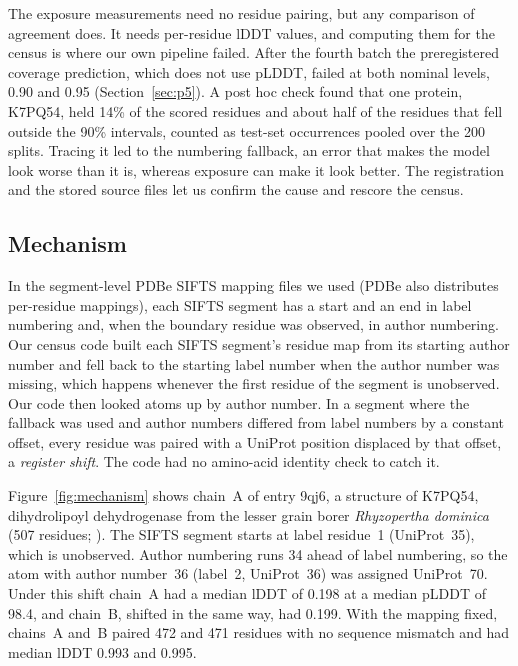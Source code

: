 \documentclass{article}
\begin{document}
The exposure measurements need no residue pairing, but any comparison of
agreement does. It needs per-residue lDDT values, and computing them for the
census is where our own pipeline failed. After the fourth batch the
preregistered coverage prediction, which does not use pLDDT, failed at both
nominal levels, 0.90 and 0.95 (Section~\ref{sec:p5}). A post hoc check
found that one protein, K7PQ54, held 14\% of the scored residues and about
half of the residues that fell outside the 90\% intervals, counted as test-set occurrences pooled over the 200 splits. Tracing it led to the numbering fallback, an error that makes the model look worse than it is, whereas exposure can make it look better. The registration and the stored
source files let us confirm the cause and rescore the census.

\subsection{Mechanism}
\label{sec:mechanism}

In the segment-level PDBe SIFTS mapping files we used (PDBe also distributes
per-residue mappings), each SIFTS segment has a start and
an end in label numbering and, when the boundary residue was observed, in
author numbering. Our census code built each SIFTS segment's residue map
from its starting author number and fell back to the starting label number
when the author number was missing, which happens whenever the first residue
of the segment is unobserved. Our code then looked atoms up by author
number. In a segment where the fallback was used and author numbers
differed from label numbers by a constant offset, every residue was paired
with a UniProt position displaced by that offset, a \emph{register shift}.
The code had no amino-acid identity check to catch it.

Figure~\ref{fig:mechanism} shows chain~A of entry 9qj6, a structure of
K7PQ54, dihydrolipoyl dehydrogenase from the lesser grain borer
\emph{Rhyzopertha dominica} (507 residues; \citealp{uniprot2025}). The SIFTS
segment starts at label residue~1 (UniProt~35), which is unobserved. Author
numbering runs 34 ahead of label numbering, so the atom with author
number~36 (label~2, UniProt~36) was assigned UniProt~70. Under this shift
chain~A had a median lDDT of 0.198 at a median pLDDT of 98.4, and chain~B,
shifted in the same way, had 0.199. With the mapping fixed, chains~A and~B
paired 472 and 471 residues with no sequence mismatch and had median
lDDT 0.993 and 0.995.
\end{document}
